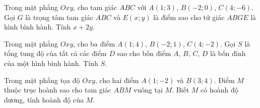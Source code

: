 \begin{bt}%
	Trong mặt phẳng $Oxy$, cho tam giác $ABC$ với $A(1;3)$, $B(-2;0)$, $C(4;-6)$. Gọi $G$ là trọng tâm tam giác $ABC$ và $E(x;y)$ là điểm sao cho tứ giác $ABGE$ là hình bình hành. Tính $x+2y$.
\end{bt}

\begin{bt}%
	Trong mặt phẳng $Oxy$, cho ba điểm $A(1;4)$, $B(-2;1)$, $C(4;-2)$. Gọi $S$ là tổng tung độ của tất cả các điểm $D$ sao cho bốn điểm $A$, $B$, $C$, $D$ là bốn đỉnh của một hình bình hành. Tính $S$.
\end{bt}

\begin{bt}%
	Trong mặt phẳng tọa độ $Oxy$, cho hai điểm $A(1;-2)$ và $B(3;4)$. Điểm $M$ thuộc trục hoành sao cho tam giác $ABM$ vuông tại $M$. Biết $M$ có hoành độ dương, tính hoành độ của $M$.
\end{bt}

